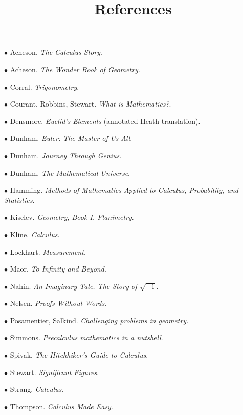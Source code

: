 \documentclass[11pt, oneside]{article}   	%
\title{References}
\date{}
\begin{document}
\maketitle
\Large


$\bullet$ Acheson.  \emph{The Calculus Story}.

$\bullet$ Acheson.  \emph{The Wonder Book of Geometry}.

$\bullet$ Corral. \emph{Trigonometry}.

$\bullet$ Courant, Robbins, Stewart. \emph{What is Mathematics?}.

$\bullet$ Densmore. \emph{Euclid's Elements} (annotated Heath translation).

$\bullet$ Dunham. \emph{Euler:  The Master of Us All}.

$\bullet$ Dunham. \emph{Journey Through Genius}.

$\bullet$ Dunham. \emph{The Mathematical Universe}.

$\bullet$ Hamming.  \emph{Methods of Mathematics Applied to Calculus, Probability, and Statistics}.

$\bullet$ Kiselev. \emph{Geometry, Book I. Planimetry}.

$\bullet$ Kline. \emph{Calculus}.

$\bullet$ Lockhart. \emph{Measurement}.

$\bullet$ Maor. \emph{To Infinity and Beyond}.

$\bullet$ Nahin. \emph{An Imaginary Tale.  The Story of $\sqrt{-1}$}.

$\bullet$ Nelsen. \emph{Proofs Without Words}.

$\bullet$ Posamentier, Salkind.  \emph{Challenging problems in geometry}.

$\bullet$ Simmons.  \emph{Precalculus mathematics in a nutshell}.

$\bullet$ Spivak.  \emph{The Hitchhiker's Guide to Calculus}.

$\bullet$ Stewart.  \emph{Significant Figures}.

$\bullet$ Strang.  \emph{Calculus}.

$\bullet$ Thompson.  \emph{Calculus Made Easy}.
\end{document}
